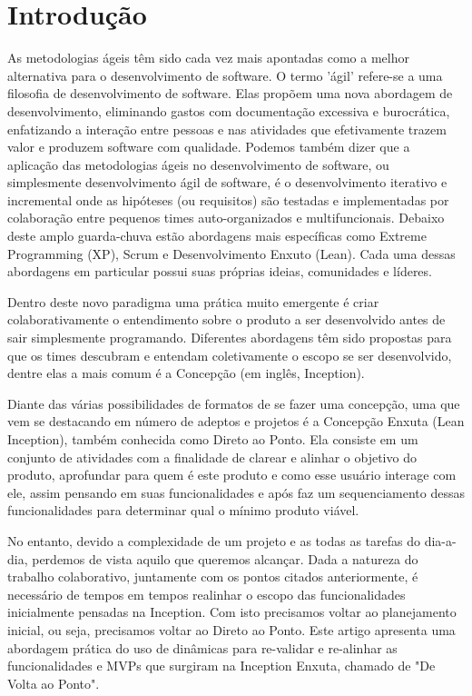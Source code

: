 \documentclass[10pt]{article}
\begin{document}
\maketitle
\section{Introdução}\label{sec:introducao}
    As metodologias ágeis têm sido cada vez mais apontadas como a melhor alternativa para o desenvolvimento de software. O termo 'ágil' refere-se a uma filosofia de desenvolvimento de software. Elas propõem uma nova abordagem de desenvolvimento, eliminando gastos com documentação excessiva e burocrática, enfatizando a interação entre pessoas e nas atividades que efetivamente trazem valor e produzem software com qualidade\cite{Agilmanifesto}. Podemos também dizer que a aplicação das metodologias ágeis no desenvolvimento de software, ou simplesmente desenvolvimento ágil de software, é o desenvolvimento iterativo e incremental onde as hipóteses (ou requisitos) são testadas e implementadas por colaboração entre pequenos times auto-organizados e multifuncionais.\cite{Bastos:Luca} Debaixo deste amplo guarda-chuva estão abordagens mais específicas como Extreme Programming (XP), Scrum e Desenvolvimento Enxuto (Lean). Cada uma dessas abordagens em particular possui suas próprias ideias, comunidades e líderes.\cite{Fowler:NewMethodology}

    Dentro deste novo paradigma uma prática muito emergente é criar colaborativamente o entendimento sobre o produto a ser desenvolvido antes de sair simplesmente programando. Diferentes abordagens têm sido propostas para que os times descubram e entendam coletivamente o escopo se ser desenvolvido, dentre elas a mais comum é a Concepção (em inglês, Inception).
    
    Diante das várias possibilidades de formatos de se fazer uma concepção, uma que vem se destacando em número de adeptos e projetos é a Concepção Enxuta (Lean Inception), também conhecida como Direto ao Ponto.\cite{Caroli:DiretoAoPonto} Ela consiste em um conjunto de atividades com a finalidade de clarear e alinhar o objetivo do produto, aprofundar para quem é este produto e como esse usuário interage com ele, assim pensando em suas funcionalidades e após faz um sequenciamento dessas funcionalidades para determinar qual o mínimo produto viável.

    No entanto, devido a complexidade de um projeto e as todas as tarefas do dia-a-dia, perdemos de vista aquilo que queremos alcançar. Dada a natureza do trabalho colaborativo, juntamente com os pontos citados anteriormente, é necessário de tempos em tempos realinhar o escopo das funcionalidades inicialmente pensadas na Inception. Com isto precisamos voltar ao planejamento inicial, ou seja, precisamos voltar ao Direto ao Ponto. Este artigo apresenta uma abordagem prática do uso de dinâmicas para re-validar e re-alinhar as funcionalidades e MVPs que surgiram na Inception Enxuta, chamado de "De Volta ao Ponto".
\end{document}
